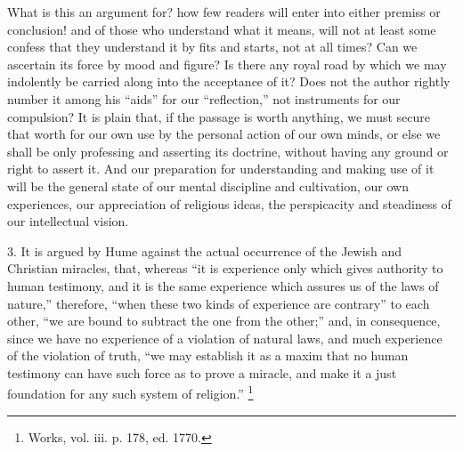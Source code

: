 What is this an argument for? how few readers will enter into
either premiss or conclusion! and of those who understand what it
means, will not at least some confess that they understand it by fits
and starts, not at all times? Can we ascertain its force by mood and
figure? Is there any royal road by which we may indolently be carried
along into the acceptance of it? Does not the author rightly number it
among his ``aids'' for our ``reflection,'' not
instruments for our compulsion? It is plain that, if the passage is
worth anything, we must secure that worth for our own use by the
personal action of our own minds, or else we shall be only professing
and asserting its doctrine, without having any ground or right to
assert it. And our preparation for understanding and making use of it
will be the general state of our mental discipline and cultivation,
our own experiences, our appreciation of religious ideas, the
perspicacity and steadiness of our intellectual vision.

3. It is argued by Hume against the actual occurrence of the Jewish
and Christian miracles, that, whereas ``it is experience only
which gives authority to human testimony, and it is the same
experience which assures us of the laws of nature,'' therefore,
``when these two kinds of experience are contrary'' to each
other, ``we are bound to subtract the one from the other;''
and, in consequence, since we have no experience of a violation of
natural laws, and much experience of the violation of truth, ``we
may establish it as a maxim that no human testimony can have such
force as to prove a miracle, and make it a just foundation for any
such system of religion.'' \footnote{Works, vol.
iii. p. 178, ed. 1770.}

